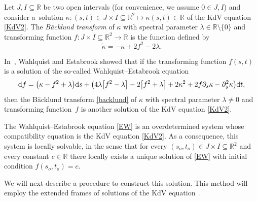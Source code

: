 \documentclass[10pt,a4paper]{amsart}
\numberwithin{equation}{section}
\def\bending{\kappa}
\def\R{\mathbb{R}}
\begin{document}
Let $J,I\subseteq\R$ be two open intervals (for convenience, we assume $0\in J,I$) and consider a~solution $\bending\colon (s,t)\in J\times I\subseteq\R^2\longmapsto\bending(s,t)\in\R$ of the KdV equation \eqref{KdV2}. The \emph{B\"{a}cklund transform} of $\bending$ with spectral parameter $\lambda\in\R\setminus\{0\}$ and transforming function $f\colon J\times I\subseteq\R^2\longrightarrow\R$ is the function defined by
\begin{equation}\label{backlund}
	\widetilde{\bending}=-\bending+2f^2-2\lambda.
\end{equation}

In~\cite{WE}, Wahlquist and Estabrook showed that if the transforming function $f(s,t)$ is a solution of the so-called Wahlquist--Estabrook equation
\begin{equation}\label{EW}
	{\rm d}f=\bigl(\bending-f^2+\lambda\bigr){\rm d}s+\bigl(4\lambda\bigl[f^2-\lambda\bigr]-2\bigl[f^2+\lambda\bigr]+2\bending^2+2f\partial_s\bending-\partial_s^2\bending\bigr){\rm d}t,
\end{equation}
then the B\"{a}cklund transform \eqref{backlund} of $\bending$ with spectral parameter $\lambda\neq 0$ and transforming function~$f$ is another solution of the KdV equation \eqref{KdV2}.

The Wahlquist--Estabrook equation \eqref{EW} is an overdetermined system whose compatibility equation is the KdV equation \eqref{KdV2}. As a consequence, this system is locally solvable, in the sense that for every $(s_o,t_o)\in J\times I\subseteq\R^2$ and every constant $c\in\R$ there locally exists a unique solution of \eqref{EW} with initial condition $f(s_o,t_o)=c$.

We will next describe a procedure to construct this solution. This method will employ the extended frames of solutions of the KdV equation~\cite{TU}.
\end{document}
